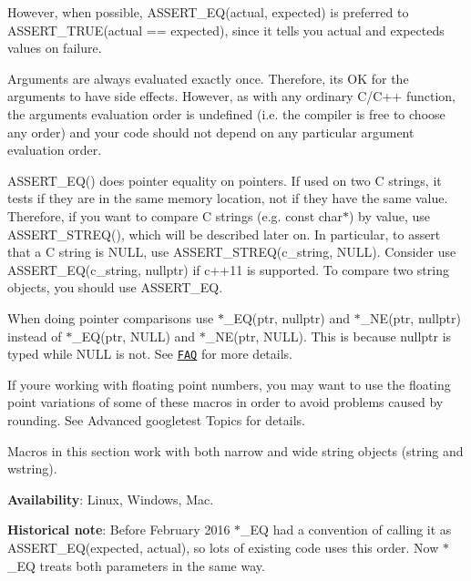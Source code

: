 However, when possible, {\ttfamily A\+S\+S\+E\+R\+T\+\_\+\+E\+Q(actual, expected)} is preferred to {\ttfamily A\+S\+S\+E\+R\+T\+\_\+\+T\+R\+UE(actual == expected)}, since it tells you {\ttfamily actual} and {\ttfamily expected}\textquotesingle{}s values on failure.

Arguments are always evaluated exactly once. Therefore, it\textquotesingle{}s OK for the arguments to have side effects. However, as with any ordinary C/\+C++ function, the arguments\textquotesingle{} evaluation order is undefined (i.\+e. the compiler is free to choose any order) and your code should not depend on any particular argument evaluation order.

{\ttfamily A\+S\+S\+E\+R\+T\+\_\+\+E\+Q()} does pointer equality on pointers. If used on two C strings, it tests if they are in the same memory location, not if they have the same value. Therefore, if you want to compare C strings (e.\+g. {\ttfamily const char$\ast$}) by value, use {\ttfamily A\+S\+S\+E\+R\+T\+\_\+\+S\+T\+R\+E\+Q()}, which will be described later on. In particular, to assert that a C string is {\ttfamily N\+U\+LL}, use {\ttfamily A\+S\+S\+E\+R\+T\+\_\+\+S\+T\+R\+E\+Q(c\+\_\+string, N\+U\+L\+L)}. Consider use {\ttfamily A\+S\+S\+E\+R\+T\+\_\+\+E\+Q(c\+\_\+string, nullptr)} if c++11 is supported. To compare two {\ttfamily string} objects, you should use {\ttfamily A\+S\+S\+E\+R\+T\+\_\+\+EQ}.

When doing pointer comparisons use {\ttfamily $\ast$\+\_\+\+EQ(ptr, nullptr)} and {\ttfamily $\ast$\+\_\+\+NE(ptr, nullptr)} instead of {\ttfamily $\ast$\+\_\+\+EQ(ptr, N\+U\+LL)} and {\ttfamily $\ast$\+\_\+\+NE(ptr, N\+U\+LL)}. This is because {\ttfamily nullptr} is typed while {\ttfamily N\+U\+LL} is not. See \href{faq.md#why-does-googletest-support-expect_eqnull-ptr-and-assert_eqnull-ptr-but-not-expect_nenull-ptr-and-assert_nenull-ptr}{\tt F\+AQ} for more details.

If you\textquotesingle{}re working with floating point numbers, you may want to use the floating point variations of some of these macros in order to avoid problems caused by rounding. See Advanced googletest Topics for details.

Macros in this section work with both narrow and wide string objects ({\ttfamily string} and {\ttfamily wstring}).

{\bfseries Availability}\+: Linux, Windows, Mac.

{\bfseries Historical note}\+: Before February 2016 {\ttfamily $\ast$\+\_\+\+EQ} had a convention of calling it as {\ttfamily A\+S\+S\+E\+R\+T\+\_\+\+E\+Q(expected, actual)}, so lots of existing code uses this order. Now {\ttfamily $\ast$\+\_\+\+EQ} treats both parameters in the same way.

